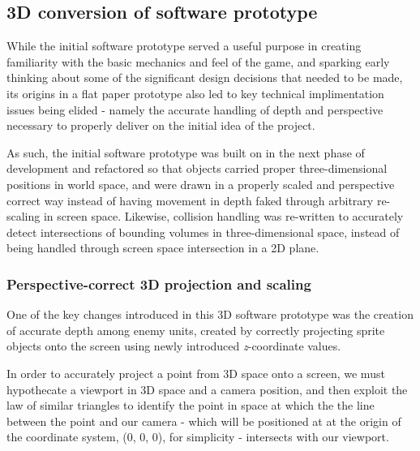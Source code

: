 \documentclass{article}
\begin{document}
\subsection{3D conversion of software prototype}\label{conversion}

While the initial software prototype served a useful purpose in creating familiarity
with the basic mechanics and feel of the game, and sparking early thinking about some of the
significant design decisions that needed to be made, its origins in a flat paper prototype
also led to key technical implimentation issues being elided - namely the accurate handling
of depth and perspective necessary to properly deliver on the initial idea of the project.

As such, the initial software prototype was built on in the next phase of development and refactored
so that objects carried proper three-dimensional positions in world space, and were drawn in a
properly scaled and perspective correct way instead of having movement in depth faked through
arbitrary re-scaling in screen space. Likewise, collision handling was re-written to accurately detect
intersections of bounding volumes in three-dimensional space, instead of being handled through
screen space intersection in a 2D plane.

\subsubsection*{Perspective-correct 3D projection and scaling}
One of the key changes introduced in this 3D software prototype was the creation of accurate
depth among enemy units, created by correctly projecting sprite objects onto the screen using
newly introduced \textit{z}-coordinate values.

In order to accurately project a point from 3D space onto a screen, we must hypothecate a viewport in 3D space
and a camera position, and then exploit the law of similar triangles to identify the point in space at
which the the line between the point and our camera - which will be positioned at at the origin of the
coordinate system, (0, 0, 0), for simplicity - intersects with our viewport.
\end{document}
